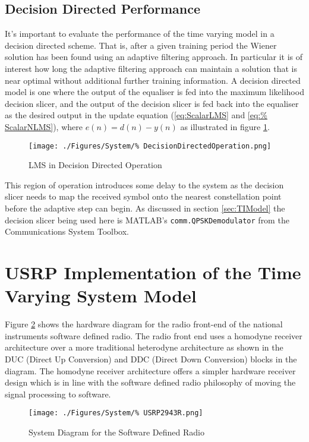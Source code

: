 \subsection{Decision Directed Performance}

It's important to evaluate the performance of the time varying model %
in a decision directed scheme. That is, after a given %
training period the Wiener solution has been found using an adaptive %
filtering approach. In particular it is of interest how long the %
adaptive filtering approach can maintain a solution that is near %
optimal without additional further training %
information. A decision directed model is one where the %
output of the equaliser is fed into the maximum likelihood %
decision slicer, and the output of the decision slicer is fed back %
into the equaliser as the desired %
output in the update equation (\ref{eq:ScalarLMS} and \ref{eq:%
ScalarNLMS}), where $e(n) = d(n) - y(n)$ as illustrated in figure %
\ref{fig:DDLMS}.
\begin{figure}[ht]
	\texttt{[image: ./Figures/System/\%
	DecisionDirectedOperation.png]}
	\caption{LMS in Decision Directed Operation}
	\label{fig:DDLMS}
\end{figure}
This region of operation introduces some delay to the system as %
the decision slicer needs to map the received symbol onto the %
nearest constellation point before the adaptive step can begin. %
As discussed in section \ref{sec:TIModel} the decision slicer %
being used here is MATLAB's \texttt{comm.QPSKDemodulator} %
from the Communications System Toolbox.

\section{USRP Implementation of the Time Varying System Model}

Figure \ref{fig:USRPDiagram} shows the hardware diagram %
for the radio front-end of the national instruments %
software defined radio. The radio front end uses a homodyne %
receiver architecture over a more traditional heterodyne %
architecture as shown in the DUC (Direct Up Conversion) and %
DDC (Direct Down Conversion) blocks in the diagram. The homodyne %
receiver architecture offers a simpler hardware receiver design %
which is in line with the software defined radio philosophy of %
moving the signal processing to software.
\begin{figure}[ht]
	\texttt{[image: ./Figures/System/\%
	USRP2943R.png]}
	\caption{System Diagram for the Software Defined Radio%
	\cite{USRPDiagram}}
	\label{fig:USRPDiagram}
\end{figure}

